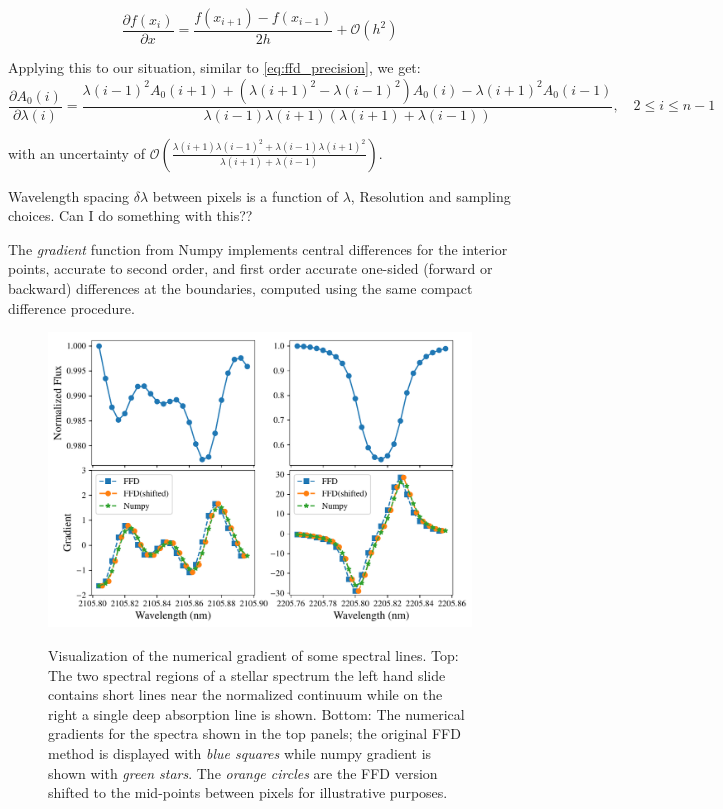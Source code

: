 \[\frac{\partial{f(x_i)}}{\partial{x}} = \frac{f\left(x_{i+1}\right) - f\left(x_{i-1}\right)}{2h} + \mathcal{O}\left({h}^{2}\right)\]


Applying this to our situation, similar to \cref{eq:ffd_precision}, we get:
\[\frac{\partial A_0(i)}{\partial\lambda(i)} = \frac{{\lambda(i-1)}^{2} A_0(i+1) + ({\lambda(i+1)}^{2}-{\lambda(i-1)}^{2}) A_0(i) - {\lambda(i+1)}^{2} A_0(i-1)} {\lambda(i-1)\lambda(i+1)(\lambda(i+1) + \lambda(i-1))}, \hspace{1em} 2 \leq i \leq n-1\]

with an uncertainty of \(\mathcal{O}\left(\frac{\lambda(i+1){\lambda(i-1)}^{2} + \lambda(i-1){\lambda(i+1)}^{2}}{\lambda(i+1) + \lambda(i-1)}\right)\).


{\red{} Wavelength spacing \(\delta\lambda\) between pixels is a function of \(\lambda\), Resolution and sampling choices.
Can I do something with this??}

The \emph{gradient} function from Numpy implements central differences for the interior points, accurate to second order, and first order accurate one-sided (forward or backward) differences at the boundaries, computed using the same compact difference procedure.

\begin{figure}
    \centering
   \includegraphics[width=0.8\linewidth]{figures/information-content/spectral_gradients}\\
    \caption{Visualization of the numerical gradient of some spectral lines.
Top: The two spectral regions of a stellar spectrum the left hand slide contains short lines near the normalized continuum while on the right a single deep absorption line is shown.
Bottom: The numerical gradients for the spectra shown in the top panels; the original {FFD} method is displayed  with \emph{blue squares} while numpy gradient is shown with \emph{green stars}.
The \emph{orange circles} are the {FFD} version shifted to the mid-points between pixels for illustrative purposes.}
    \label{fig:gradients}
\end{figure}


